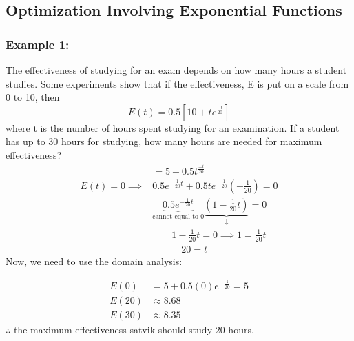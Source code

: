 \documentclass{article}
\begin{document}
\subsection{Optimization Involving Exponential Functions}
\subsubsection*{Example 1:}
The effectiveness of studying for an exam depends on how many hours a student studies. Some experiments show that if the effectiveness, E is put on a scale from 0 to 10, then
$$E(t)=0.5\left[10+te^{\frac{-t}{20}}\right]$$
where t is the number of hours spent studying for an examination. If a student has up to 30 hours for studying, how many hours are needed for maximum effectiveness?
\begin{align*}
    &=5+0.5t^{\frac{-t}{20}}\\
    E(t)=0 \implies & 0.5e^{-\frac{1}{20}t}+0.5te^{-\frac{1}{20}} \left(-\frac{1}{20}\right)=0\\
    &\underbrace{0.5e^{-\frac{1}{20}t}}_{\text{cannot equal to 0}} \underbrace{\left(1-\frac{1}{20}t\right)}_{\downarrow }=0\\
    &\quad \quad 1-\frac{1}{20}t=0 \implies 1=\frac{1}{20}t\\
    &\quad \quad \quad 20=t
\end{align*}
Now, we need to use the domain analysis:

\begin{align*}
    E(0)&=5+0.5(0)e^{-\frac{1}{20}}=5\\
    E(20)&\approx8.68\\
    E(30)&\approx8.35
\end{align*}
$\therefore$ the maximum effectiveness satvik should study 20 hours.
\end{document}
